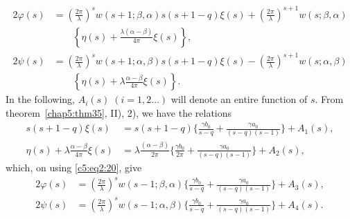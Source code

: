 \begin{align*}
2\varphi(s) & = (\frac{2\pi}{\lambda})^s w(s+1;\beta,\alpha) s(s+1-q)
\xi(s) + (\frac{2\pi}{\lambda})^{s+1}w(s;\beta,\alpha)\\ 
&\qquad\left\{\eta (s)+
\frac{\lambda(\alpha-\beta)}{4\pi} \xi(s)\right\},\\
2\psi (s) & = (\frac{2\pi}{\lambda})^s w(s+1;\alpha,\beta) s(s+1-q)
\xi(s) -(\frac{2\pi}{\lambda})^{s+1} w(s;\alpha,\beta)\\  
&\qquad\left\{\eta(s) +
\lambda \frac{\alpha-\beta}{4\pi} \xi(s)\right\}.\tag{21}\label{c5:eq2:21}
\end{align*}
In the following, $A_i(s) \; (i=1,2\ldots)$ will denote an entire function
of $s$. From theorem~\ref{chap5:thm35}, II), 2), we have the relations
\begin{align*}
s(s+1-q) \xi(s) & = s(s+1-q) \{\frac{\gamma b_0}{s-q} + \frac{\gamma
  a_0}{(s-q)(s-1)}\} + A_1(s),\\
\eta(s) + \lambda \frac{\alpha-\beta}{4\pi} \xi(s) & =\lambda
\frac{(\alpha-\beta)}{2\pi} \{\frac{\gamma b_0}{2\pi} + \frac{\gamma
  a_0}{(s-q)(s-1)}\} + A_2(s),
\end{align*}\pageoriginale
which, on using \eqref{c5:eq2:20}, give
\begin{align*}
2\varphi(s) & = (\frac{2\pi}{\lambda})^s w(s-1;\beta, \alpha)
\{\frac{\gamma b_0}{s-q} + \frac{\gamma a_0}{(s-q)(s-1)}\} + A_3(s),\\
2\psi (s) & = (\frac{2\pi}{\lambda})^s w(s-1;\alpha,\beta)
\{\frac{\gamma b_0}{s-q} + \frac{\gamma a_0}{(s-q)(s-1)}\} + A_4
(s). \tag{22}\label{c5:eq2:22} 
\end{align*}

